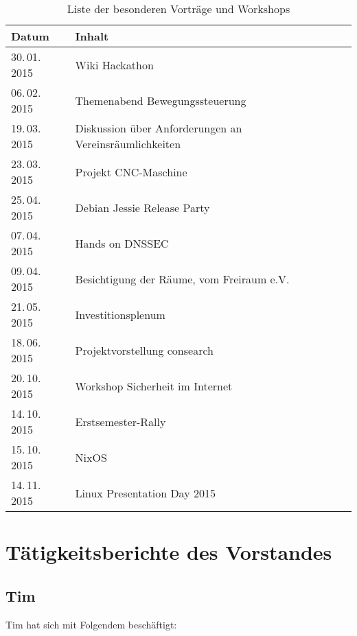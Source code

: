 \documentclass[ngerman]{scrartcl}
\begin{document}
\begin{table}[h]
  \centering{}
  \begin{tabularx}{\textwidth}{l|X}
	\textbf{Datum} & \textbf{Inhalt} \\ \midrule
	30.\,01.\,2015 & Wiki Hackathon \\
        06.\,02.\,2015 & Themenabend Bewegungssteuerung \\
	19.\,03.\,2015 & Diskussion über Anforderungen an Vereinsräumlichkeiten \\
	23.\,03.\,2015 & Projekt CNC-Maschine \\
	25.\,04.\,2015 & Debian Jessie Release Party \\
        07.\,04.\,2015 & Hands on DNSSEC \\
	09.\,04.\,2015 & Besichtigung der Räume, vom Freiraum e.V. \\
	21.\,05.\,2015 & Investitionsplenum \\
	18.\,06.\,2015 & Projektvorstellung consearch \\
	20.\,10.\,2015 & Workshop Sicherheit im Internet \\
	14.\,10.\,2015 & Erstsemester-Rally \\
        15.\,10.\,2015 & NixOS \\
	14.\,11.\,2015 & Linux Presentation Day 2015 \\
\bottomrule
	\end{tabularx}
	\caption{Liste der besonderen Vorträge und Workshops}
\end{table}

\section{Tätigkeitsberichte des Vorstandes}

\subsection{Tim}

Tim hat sich mit Folgendem beschäftigt:
\end{document}
